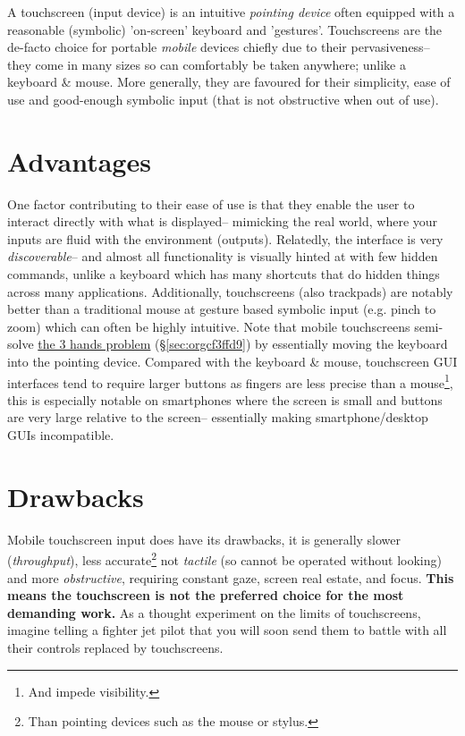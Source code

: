 \documentclass[logo,bsc,singlespacing,parskip]{infthesis}
\begin{document}
A touchscreen (input device) is an intuitive  \emph{pointing device} often equipped with a reasonable (symbolic) 'on-screen' keyboard and 'gestures'.
Touchscreens are the de-facto choice for portable \emph{mobile} devices chiefly due to their pervasiveness-- they come in many sizes so can comfortably be taken anywhere; unlike a keyboard \& mouse.
More generally, they are favoured for their simplicity, ease of use and good-enough symbolic input (that is not obstructive when out of use).
\section{Advantages}
\label{sec:orgd4589b4}
One factor contributing to their ease of use is that they enable the user to interact directly with what is displayed-- mimicking the real world, where your inputs are fluid with the environment (outputs).
Relatedly, the interface is very \emph{discoverable}-- and almost all functionality is visually hinted at with few hidden commands, unlike a keyboard which has many shortcuts that do hidden things across many applications.
Additionally, touchscreens (also trackpads) are notably better than a traditional mouse at gesture based symbolic input (e.g. pinch to zoom) which can often be highly intuitive.
Note that mobile touchscreens semi-solve \hyperref[sec:orgcf3ffd9]{the 3 hands problem} (\S \ref{sec:orgcf3ffd9}) by essentially moving the keyboard into the pointing device.
Compared with the keyboard \& mouse, touchscreen GUI interfaces tend to require larger buttons as fingers are less precise than a mouse\footnote{And impede visibility.}, this is especially notable on smartphones where the screen is small and buttons are very large relative to the screen-- essentially making smartphone/desktop GUIs incompatible.

\section{Drawbacks}
\label{sec:orgf3c7ad8}
Mobile touchscreen input does have its drawbacks, it is generally slower (\emph{throughput}), less accurate\footnote{Than pointing devices such as the mouse or stylus.}   not \emph{tactile} (so cannot be operated without looking) and more \emph{obstructive}, requiring constant gaze, screen real estate, and focus.
\textbf{This means the touchscreen is not the preferred choice for the most demanding work.}
As a thought experiment on the limits of  touchscreens, imagine telling a fighter jet pilot that you will soon send them to battle with all their controls replaced by touchscreens.
\end{document}

